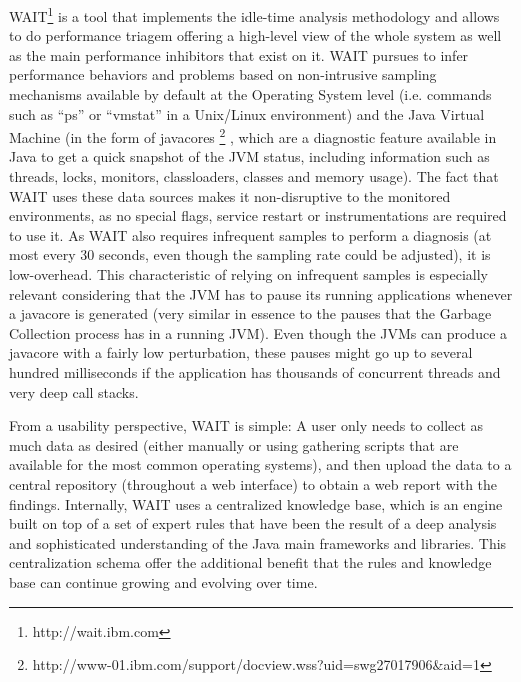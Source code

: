 \documentclass[runningheads,a4paper]{llncs}
\begin{document}
WAIT\footnote{http://wait.ibm.com} is a tool that implements the idle-time
analysis methodology and allows to do performance triagem offering a
high-level view of the whole system as well as the main performance inhibitors
that exist on it. WAIT pursues to infer performance behaviors and problems based
on non-intrusive sampling mechanisms available by default at the Operating System 
level (i.e. commands such as ``ps'' or ``vmstat'' in a Unix/Linux
environment) and the Java Virtual Machine (in the form of javacores
\footnote{http://www-01.ibm.com/support/docview.wss?uid=swg27017906\&aid=1}
, which are a diagnostic feature available in Java to get a quick snapshot of
the JVM status, including information such as threads, locks, monitors,
classloaders, classes and memory usage). The fact that WAIT uses these data
sources makes it non-disruptive to the monitored environments, as no special flags, 
service restart or instrumentations are required to use it. As WAIT also
requires infrequent samples to perform a diagnosis (at most every 30 seconds,
even though the sampling rate could be adjusted), it is low-overhead. This
characteristic of relying on infrequent samples is especially relevant considering 
that the JVM has to pause its running applications whenever a javacore is
generated (very similar in essence to the pauses that the Garbage Collection
process has in a running JVM). Even though the JVMs can produce a javacore with
a fairly low perturbation, these pauses might go up to several hundred milliseconds if the 
application has thousands of concurrent threads and very deep call stacks.

From a usability perspective, WAIT is simple: A user only needs to
collect as much data as desired (either manually or using gathering scripts
that are available for the most common operating systems), and then upload the
data to a central repository (throughout a web interface) to obtain a web 
report with the findings. Internally, WAIT uses a centralized knowledge base,
which is an engine built on top of a set of expert rules that have been the result of a 
deep analysis and sophisticated understanding of the Java main frameworks and
libraries. This centralization schema offer the additional benefit that
the rules and knowledge base can continue growing and evolving over time.
\end{document}
